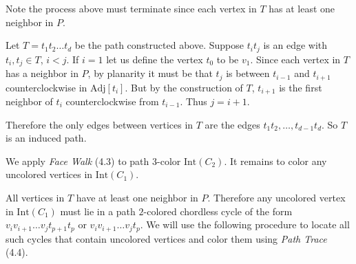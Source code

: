 \documentclass[letterpaper, 12pt]{article}
\theoremstyle{definition}
\theoremstyle{definition}
\theoremstyle{thm}
\theoremstyle{definition}
\begin{document}
Note the process above must terminate since each vertex in $T$ has at least
one neighbor in $P$.

Let $T=t_1t_2\ldots t_d$ be the path constructed above. Suppose $t_it_j$ is an
edge with $t_i,t_j\in T$, $i<j$. If $i=1$ let us define the vertex $t_0$ to be
$v_1$. Since each vertex in $T$ has a neighbor in
$P$, by planarity it must be that $t_j$ is between $t_{i-1}$ and $t_{i+1}$
counterclockwise in $\text{Adj}[t_i]$. But by the construction of
$T$, $t_{i+1}$ is the first neighbor of $t_i$ counterclockwise from $t_{i-1}$.
Thus $j=i+1$.

Therefore the only edges between vertices in $T$ are the edges $t_1t_2,\ldots,
t_{d-1}t_d$. So $T$ is an induced path.

We apply \textit{Face Walk} (4.3) to path $3$-color $\text{Int}(C_2)$. It remains
to color any uncolored vertices in $\text{Int}(C_1)$.

All vertices in $T$ have at least one neighbor in $P$. Therefore any uncolored
vertex in $\text{Int}(C_1)$ must lie in a path $2$-colored chordless cycle of
the form $v_iv_{i+1}\ldots v_jt_{p+1}t_p$ or $v_iv_{i+1}\ldots v_jt_p$.
We will use the following procedure to locate all such cycles that contain
uncolored vertices and color them using \textit{Path Trace} (4.4).
\end{document}
